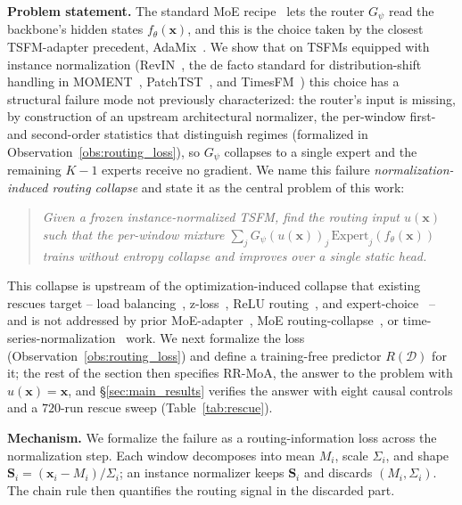 \documentclass{article}
\begin{document}
\textbf{Problem statement.} The standard MoE recipe~\citep{shazeer2017outrageously, fedus2022switch} lets the router $G_\psi$ read the backbone's hidden states $f_\theta(\mathbf{x})$, and this is the choice taken by the closest TSFM-adapter precedent, AdaMix~\citep{wang2022adamix}. We show that on TSFMs equipped with instance normalization (RevIN~\citep{kim2021revin}, the de facto standard for distribution-shift handling in MOMENT~\citep{goswami2024moment}, PatchTST~\citep{nie2023patchtst}, and TimesFM~\citep{das2024timesfm}) this choice has a structural failure mode not previously characterized: the router's input is missing, by construction of an upstream architectural normalizer, the per-window first- and second-order statistics that distinguish regimes (formalized in Observation~\ref{obs:routing_loss}), so $G_\psi$ collapses to a single expert and the remaining $K{-}1$ experts receive no gradient. We name this failure \emph{normalization-induced routing collapse} and state it as the central problem of this work:
\begin{quote}
\itshape Given a frozen instance-normalized TSFM, find the routing input $u(\mathbf{x})$ such that the per-window mixture $\sum_j G_\psi(u(\mathbf{x}))_j\,\mathrm{Expert}_j(f_\theta(\mathbf{x}))$ trains without entropy collapse and improves over a single static head.
\end{quote}
This collapse is upstream of the optimization-induced collapse that existing rescues target -- load balancing~\citep{shazeer2017outrageously, fedus2022switch}, z-loss~\citep{zoph2022stmoe}, ReLU routing~\citep{wang2025remoe}, and expert-choice~\citep{zhou2022expertchoice} -- and is not addressed by prior MoE-adapter~\citep{wang2022adamix, wu2024mole}, MoE routing-collapse~\citep{chi2022representation, wu2024mhmoe, puigcerver2024softmoe, panda2024densebackprop, hua2025inputaware, guo2025expertspec}, or time-series-normalization~\citep{liu2022nonstationary, fan2023dishts, liu2023san, ye2024fan, dai2024ddn, berthelier2026revin, zou2025ibnorm} work. We next formalize the loss (Observation~\ref{obs:routing_loss}) and define a training-free predictor $R(\mathcal{D})$ for it; the rest of the section then specifies RR-MoA, the answer to the problem with $u(\mathbf{x})\!=\!\mathbf{x}$, and \S\ref{sec:main_results} verifies the answer with eight causal controls and a $720$-run rescue sweep (Table~\ref{tab:rescue}).

\textbf{Mechanism.}\label{sec:mechanism}\label{sec:diagnosis}
We formalize the failure as a routing-information loss across the normalization step. Each window decomposes into mean $M_i$, scale $\Sigma_i$, and shape $\mathbf{S}_i = (\mathbf{x}_i - M_i)/\Sigma_i$; an instance normalizer keeps $\mathbf{S}_i$ and discards $(M_i,\Sigma_i)$. The chain rule then quantifies the routing signal in the discarded part.
\end{document}
